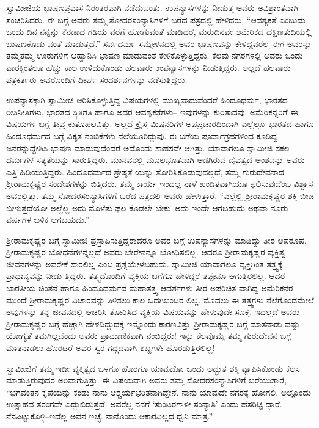 ಸ್ವಾಮೀಜಿಯ ಭಾಷಣಪ್ರವಾಸ ನಿರಂತರವಾಗಿ ನಡೆದುಬಂತು. ಉಪನ್ಯಾಸಗಳನ್ನು ನೀಡುತ್ತ ಅವರು ಅವಿಶ್ರಾಂತವಾಗಿ ಸಂಚರಿಸಿದರು. ಈ ಬಗ್ಗೆ ಅವರು ತಮ್ಮ ಸೋದರಸಂನ್ಯಾಸಿಗಳಿಗೆ ಬರೆದ ಪತ್ರದಲ್ಲಿ ಹೇಳಿದರು, “ಆವಶ್ಯಕತೆ ಎಂಬುದು ಒಂದು ದಿನ ನನ್ನನ್ನು ಕೆನಡಾದ ಗಡಿಯ ವರೆಗೆ ಹೋಗುವಂತೆ ಮಾಡಿದರೆ, ಮರುದಿನವೇ ಅಮೆರಿಕದ ದಕ್ಷಿಣತುದಿಯಲ್ಲಿ ಭಾಷಣಕೊಡು ವಂತೆ ಮಾಡುತ್ತದೆ.” ಸರ್ವಧರ್ಮ ಸಮ್ಮೇಳನದಲ್ಲಿ ಅವರ ಭಾಷಣವನ್ನು ಕೇಳಿದ್ದವರೆಲ್ಲ ಈಗ ಅವರನ್ನು ತಮ್ಮತಮ್ಮ ಊರುಗಳಿಗೆ ಆಹ್ವಾನಿಸಿ ಭಾಷಣ ಮಾಡುವಂತೆ ಕೇಳಿಕೊಳ್ಳುತ್ತಿದ್ದರು. ಕೆಲವು ನಗರಗಳಲ್ಲಿ ಅವರು ಒಂದು ವಾರಕ್ಕಿಂತಲೂ ಹೆಚ್ಚು ಕಾಲ ಉಳಿದುಕೊಂಡು ಹಲವಾರು ಉಪನ್ಯಾಸಗಳನ್ನು ನೀಡುತ್ತಿದ್ದರು. ಅಲ್ಲದೆ ಹಲವಾರು ಪತ್ರಕರ್ತರು ಅವರೊಂದಿಗೆ ದೀರ್ಘ ಸಂದರ್ಶನಗಳನ್ನು ನಡೆಸುತ್ತಿದ್ದರು.

ಉಪನ್ಯಾಸಕ್ಕಾಗಿ ಸ್ವಾಮೀಜಿ ಆರಿಸಿಕೊಳ್ಳುತ್ತಿದ್ದ ವಿಷಯಗಳಲ್ಲಿ ಮುಖ್ಯವಾದುವೆಂದರೆ ಹಿಂದೂಧರ್ಮ, ಭಾರತದ ರೀತಿನೀತಿಗಳು, ಭಾರತದ ಸ್ಥಿತಿಗತಿ ಹಾಗೂ ಅದರ ಆವಶ್ಯಕತೆಗಳು– ಇವುಗಳನ್ನು ಕುರಿತಾದವು. ಅಮೆರಿಕನ್ನರಿಗೆ ಈ ವಿಷಯಗಳ ಬಗ್ಗೆ ತೀವ್ರ ಕುತೂಹಲವಿತ್ತು. ಅಲ್ಲದೆ ಕ್ರೈಸ್ತ ಮಿಷನರಿಗಳ ಅಪಪ್ರಚಾರದಿಂದಾಗಿ ಎಲ್ಲೆಲ್ಲೂ ಭಾರತದ ಹಾಗೂ ಹಿಂದೂಧರ್ಮದ ಬಗ್ಗೆ ವಿಕೃತ ನಂಬಿಕೆಗಳು ನೆಲೆಯೂರಿದ್ದುವು. ಈ ಬಗೆಯ ಪೂರ್ವಾಗ್ರಹಗಳಿಂದ ಕೂಡಿದ್ದ ಜನರನ್ನುದ್ದೇಶಿಸಿ ಭಾಷಣ ಮಾಡುವುದೆಂದರೆ ಅದೊಂದು ಸಾಹಸವೇ ಆಗಿತ್ತು. ಯಾವಾಗಲೂ ಸ್ವಾಮೀಜಿ ಸಕಲ ಧರ್ಮಗಳ ಸತ್ಯತೆಯನ್ನು ಸಾರುತ್ತಿದ್ದರು. ಮಾನವನಲ್ಲಿ ಮೂಲಭೂತವಾಗಿ ಅಡಗಿರುವ ದೈವತ್ವದ ಅಂಶವನ್ನು ಅವರು ಎತ್ತಿ ಹಿಡಿಯುತ್ತಿದ್ದರು. ಹಿಂದೂಧರ್ಮದ ಶ್ರೇಷ್ಠತೆ ಯನ್ನು ತೋರಿಸಿಕೊಡುವುದಲ್ಲದೆ, ತಮ್ಮ ಗುರುದೇವನಾದ ಶ್ರೀರಾಮಕೃಷ್ಣರ ಸಂದೇಶಗಳನ್ನು ಬಿತ್ತಿದರು. ತಮ್ಮ ಕಾರ್ಯ ಇಂದಲ್ಲ ನಾಳೆ ಖಂಡಿತವಾಗಿಯೂ ಫಲಿಸುವುದೆಂಬ ವಿಶ್ವಾಸ ಅವರಲ್ಲಿತ್ತು. ತಮ್ಮ ಸೋದರಸಂನ್ಯಾಸಿಗಳಿಗೆ ಬರೆದ ಪತ್ರದಲ್ಲಿ ಅವರು ಹೇಳುತ್ತಾರೆ, “ಎಲ್ಲೆಲ್ಲಿ ಶ್ರೀರಾಮಕೃಷ್ಣರ ಶಕ್ತಿ ಬೀಜ ಬೀಳುತ್ತದೆಯೋ ಅಲ್ಲೆಲ್ಲ ಅದು ಮೊಳೆತು ಫಲ ಕೊಡಲೇ ಬೇಕು–ಅದು ಇಂದೇ ಆಗಬಹುದು ಅಥವಾ ನೂರು ವರ್ಷಗಳ ಬಳಿಕ ಆಗಬಹುದು.”

ಶ್ರೀರಾಮಕೃಷ್ಣರ ಬಗ್ಗೆ ಸ್ವಾಮೀಜಿ ಪ್ರಸ್ತಾಪಿಸುತ್ತಿದ್ದರಾದರೂ ಅವರ ಬಗ್ಗೆ ಉಪನ್ಯಾಸಗಳನ್ನು ಮಾಡಿದ್ದು ತೀರ ಅಪರೂಪ. ಶ್ರೀರಾಮಕೃಷ್ಣರ ಬೋಧನೆಗಳನ್ನಲ್ಲದೆ ಅವರು ಬೇರೇನನ್ನೂ ಬೋಧಿಸಲಿಲ್ಲ. ಆದರೂ ಶ್ರೀರಾಮಕೃಷ್ಣರ ವ್ಯಕ್ತಿತ್ವ-ಜೀವನಗಳನ್ನು ಅವರೇಕೆ ಸಾರಲಿಲ್ಲ ಎಂಬ ಪ್ರಶ್ನೆಯೇಳಬಹುದು. ಸ್ವಾಮೀಜಿ ಯಾವಾಗಲೂ ವ್ಯಕ್ತಿಗಿಂತ ತತ್ತ್ವಕ್ಕೆ ಪ್ರಾಧಾನ್ಯವನ್ನು ನೀಡು ತ್ತಿದ್ದರು. ತತ್ತ್ವದೊಂದಿಗೆ ವ್ಯಕ್ತಿಯ ಬಗೆಗೂ ಹೇಳಿದ್ದರೆ ತಪ್ಪೇನೂ ಆಗುತ್ತಿರಲಿಲ್ಲ. ಆದರೆ ಭಾರತೀಯ ಚಿಂತನೆ ಹಾಗೂ ಹಿಂದೂಧರ್ಮದ ಮಹಾತತ್ತ್ವ-ಆದರ್ಶಗಳು ತೀರ ಅಪರಿಚಿತ ವಾಗಿದ್ದ ಅಮೆರಿಕನರ ಮುಂದೆ ಶ್ರೀರಾಮಕೃಷ್ಣರ ವಿಚಾರವನ್ನು ತಿಳಿಸಲು ಕಾಲ ಒದಗಿಬಂದಿರ ಲಿಲ್ಲ. ಮೊದಲು ಈ ತತ್ತ್ವಗಳು ನೆಲೆಗೊಂಡಮೇಲೆ ಅವುಗಳನ್ನು ತನ್ನ ಜೀವನದಲ್ಲಿ ಆಚರಿಸಿ ತೋರಿಸಿದ ವ್ಯಕ್ತಿಯ ವಿಷಯವನ್ನು ಹೇಳುವುದೇ ಸೂಕ್ತ. ಇದಲ್ಲದೆ ಅವರು ಶ್ರೀರಾಮಕೃಷ್ಣರ ಬಗ್ಗೆ ಹೆಚ್ಚಾಗಿ ಹೇಳದಿದ್ದುದಕ್ಕೆ ಇನ್ನೊಂದು ಕಾರಣವಿತ್ತು–ಶ್ರೀರಾಮಕೃಷ್ಣರ ಬಗ್ಗೆ ಮಾತನಾಡು ವಷ್ಟು ಯೋಗ್ಯತೆ ತಮಗಿಲ್ಲವೆಂದು ಅವರು ಪ್ರಾಮಾಣಿಕವಾಗಿ ನಂಬಿದ್ದರು! ಇನ್ನು ಕೆಲವೊಮ್ಮೆ ತಮ್ಮ ಗುರುದೇವನ ಬಗ್ಗೆ ಮಾತನಾಡಲು ಹೊರಟರೆ ಅವರ ಸ್ವರ ಗದ್ಗದವಾಗಿ ಶಬ್ದಗಳೇ ಹೊರಡುತ್ತಿರಲಿಲ್ಲ!

ಸ್ವಾಮೀಜಿಗೆ ತಮ್ಮ ಇಡೀ ವ್ಯಕ್ತಿತ್ವದ ಒಳಗೂ ಹೊರಗೂ ಯಾವುದೋ ಒಂದು ಅದ್ಭುತ ಶಕ್ತಿ ವ್ಯಾಪಿಸಿಕೊಂಡು ಕೆಲಸ ಮಾಡುತ್ತಿರುವುದರ ಅರಿವಾಗುತ್ತಿತ್ತು. ಈ ವಿಷಯವಾಗಿ ಅವರು ತಮ್ಮ ಸೋದರಸಂನ್ಯಾಸಿಗಳಿಗೆ ಬರೆಯುತ್ತಾರೆ, “ಭಗವಂತನ ಕೃಪೆಯನ್ನು ಕಂಡು ನಾನು ಆಶ್ಚರ್ಯಭರಿತನಾಗಿದ್ದೇನೆ. ನಾನು ಯಾವುದೇ ನಗರಕ್ಕೆ ಹೋಗಲಿ, ಅಲ್ಲೊಂದು ಉತ್ಸಾಹದ ತರಂಗವೇ ಎದ್ದುಬಿಡುತ್ತದೆ. ಅವರೆಲ್ಲ ನನಗೆ ‘ಸುಂಟರಗಾಳೀ ಸಂನ್ಯಾಸಿ’ ಎಂದು ಹೆಸರಿಟ್ಟಿ ದ್ದಾರೆ. ನೆನಪಿಟ್ಟುಕೊಳ್ಳಿ–ಇದೆಲ್ಲ ಅವನ ಇಚ್ಛೆ. ನಾನೊಂದು ಆಕಾರವಿಲ್ಲದ ಧ್ವನಿ ಮಾತ್ರ.”

